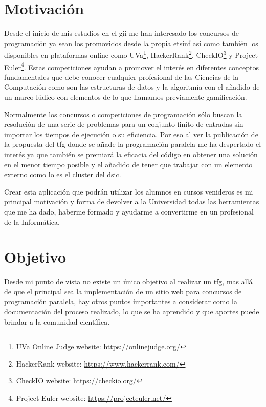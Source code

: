 \documentclass[11pt,spanish,listoffigures,listoftables]{tfgetsinf}
\begin{document}
\section{Motivación}

Desde el inicio de mis estudios en el \acrshort{gii} me han interesado los concursos de programación ya sean los promovidos desde la propia \acrshort{etsinf} así como también los disponibles en plataformas online como UVa\footnote{UVa Online Judge website: \url{https://onlinejudge.org/}}, HackerRank\footnote{HackerRank website: \url{https://www.hackerrank.com/}}, CheckIO\footnote{CheckIO website: \url{https://checkio.org/}} y Project Euler\footnote{Project Euler website: \url{https://projecteuler.net/}}. Estas competiciones ayudan a promover el interés en diferentes conceptos fundamentales que debe conocer cualquier profesional de las Ciencias de la Computación como son las estructuras de datos y la algoritmia con el añadido de un marco lúdico con elementos de lo que llamamos previamente gamificación. \par

Normalmente los concursos o competiciones de programación sólo buscan la resolución de una serie de problemas para un conjunto finito de entradas sin importar los tiempos de ejecución o su eficiencia. Por eso al ver la publicación de la propuesta del \acrfull{tfg} donde se añade la programación paralela me ha despertado el interés ya que también se premiará la eficacia del código en obtener una solución en el menor tiempo posible y el añadido de tener que trabajar con un elemento externo como lo es el \foreignlanguage{english}{cluster} \kahan del \acrfull{dsic}.  \par

Crear esta aplicación que podrán utilizar los alumnos en cursos venideros es mi principal motivación y forma de devolver a la Universidad todas las herramientas que me ha dado, haberme formado y ayudarme a convertirme en un profesional de la Informática. 

\section{Objetivo}

Desde mi punto de vista no existe un único objetivo al realizar un \acrfull{tfg}, mas allá de que el principal sea la implementación de un sitio web para concursos de programación paralela, hay otros puntos importantes a considerar como la documentación del proceso realizado, lo que se ha aprendido y que aportes puede brindar a la comunidad científica. \par 
\end{document}
